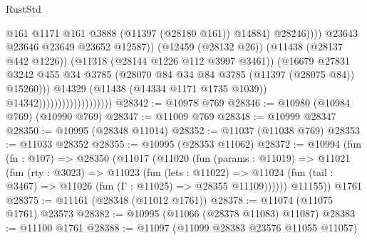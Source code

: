 \begin{lexlean}{RustStd}
\begin{coremodule}
                                                          @161
                                                          @1171
                                                          @161
                                                          @3888
                                                          (@11397 (@28180 @161))
                                                          @14884)
                                                        @28246))))
                                                @23643
                                                @23646
                                                @23649
                                                @23652
                                                @12587))
                                            (@12459 (@28132 @26))
                                            (@11438 (@28137 @442 @1226))
                                            (@11318 (@28144 @1226 @112 @3997 @3461))
                                            (@16679
                                              @27831
                                              @3242
                                              @455
                                              @34
                                              @3785
                                              (@28070
                                                @84
                                                @34
                                                @84
                                                @3785
                                                (@11397 (@28075 @84))
                                                @15260)))
                                          @14329
                                          (@11438 (@14334 @1171 @1735 @1039))
                                          @14342)))))))))))))))))))
@28342 := @10978 @769
@28346 := @10980 (@10984 @769) (@10990 @769)
@28347 := @11009 @769
@28348 := @10999 @28347
@28350 := @10995 (@28348 @11014)
@28352 := @11037 (@11038 @769)
@28353 := @11033 @28352
@28355 := @10995 (@28353 @11062)
@28372 := @10994
    (fun (fn : @107) =>
    @28350
      (@11017
        (@11020
          (fun (params : @11019) =>
          @11021
            (fun (rty : @3023) =>
            @11023
              (fun (lets : @11022) =>
              @11024 (fun (tail : @3467) => @11026 (fun (Γ : @11025) => @28355 @11109))))))
        @11155))
    @1761
@28375 := @11161 (@28348 (@11012 @1761))
@28378 := @11074 (@11075 @1761) @23573
@28382 := @10995 (@11066 (@28378 @11083) @11087)
@28383 := @11100 @1761
@28388 := @11097 (@11099 @28383 @23576 @11055 @11057)

\end{coremodule}
\end{lexlean}
